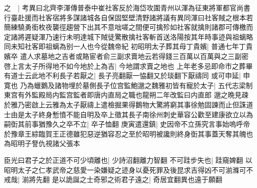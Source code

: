 之　|{
	考異曰北齊李渾傳普泰中崔社客反於海岱攻圍青州以渾為征東將軍都官尚書行臺赴援而社客宿將多謀諸城各自保固堅壁清野諸將議有異同渾曰社客賊之根本若簡練驍勇銜枚夜襲徑趨營下出其不意咄嗟之間便可擒殄如社客就擒則諸郡可傳檄而定諸將遲疑渾乃速行未明達城下賊徒驚散擒社客斬首送洛陽按其年時事迹與祖螭略同未知社客即祖螭為别一人也今從魏帝紀}
初昭明太子葬其母丁貴嬪|{
	普通七年丁貴嬪卒}
遣人求墓地之吉者或賂宦者俞三副求賣地云若得錢三百萬以百萬與之三副密啓上言太子所得地不如今地於上為吉|{
	今地謂求賣之地也}
上年老多忌即命市之葬畢有道士云此地不利長子若厭之|{
	長子亮翻厭一恊翻又於琰翻下厭禱同}
或可申延|{
	申寛也}
乃為蠟鵝及諸物埋於墓側長子位宫監鮑邈之魏雅初皆有寵於太子|{
	五代志梁制東宫有外監殿局内監宫監者即唐内直局之職也龍朔二年改監曰内直郎}
邈之晩見疎於雅乃密啟上云雅為太子厭禱上遣檢掘果得鵝物大驚將窮其事徐勉固諫而止但誅道士由是太子終身慙憤不能自明及卒上徵其長子南徐州刺史華容公歡至建康欲立以為嗣衘其前事猶豫久之卒不立|{
	卒子恤翻}
庚寅遣還鎮|{
	史因帝不立孫究言事始嗚呼帝於豫章王綜臨賀王正德雖犯惡逆猶容忍之至於昭明被讒則終身衘其事蓋天奪其魄也為昭明子詧仇視諸父張本}


臣光曰君子之於正道不可少頃離也|{
	少詩沼翻離力智翻}
不可跬步失也|{
	跬窺婢翻}
以昭明太子之仁孝武帝之慈愛一染嫌疑之迹身以憂死罪及後昆求吉得凶不可湔滌可不戒哉|{
	湔將先翻}
是以詭誕之士奇邪之術君子遠之|{
	奇居宜翻異也遠于願翻}



